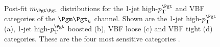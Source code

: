 \begin{figure}[tbh]

\caption[Post-fit $m_{\Pgt\Pgt}$ distributions for the 1-jet high-$\pt^{\Pgt}$ and VBF 
categories of the $\mutau$ channel.]{Post-fit $m_{\Pgt\Pgt}$ distributions for
the 1-jet high-$\pt^{\Pgt}$ and VBF categories of the $\mutau$ channel. Shown
are the 1-jet high-$\pt^{\Pgt}$ (a), 1-jet high-$\pt^{\Pgt}$ boosted (b), 
VBF loose (c) and VBF tight (d) categories. These
are the four most sensitive categories \cite{HIG-13-004}.}
\label{fig:postfit1jetvbfmutau}
\end{figure}

